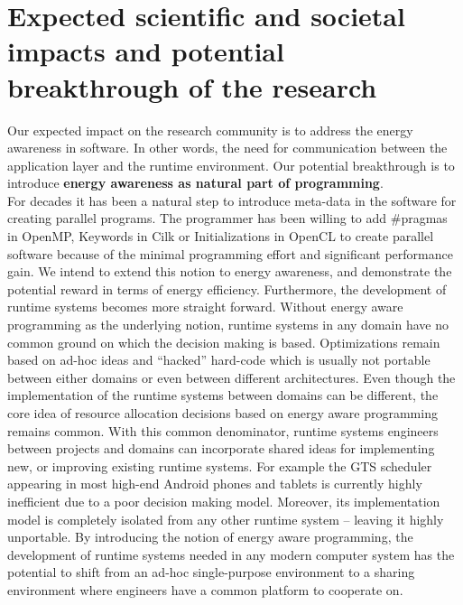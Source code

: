 \documentclass{article}
\begin{document}
\section{Expected scientific and societal impacts and potential breakthrough of the research}
Our expected impact on the research community is to address the energy awareness in software. 
In other words, the need for communication between the application layer and the runtime environment. 
Our potential breakthrough is to introduce \textbf{energy awareness as natural part of programming}.\\ 
For decades it has been a natural step to introduce meta-data in the software for creating parallel programs. 
The programmer has been willing to add \#pragmas in OpenMP, Keywords in Cilk or Initializations in OpenCL to create parallel software because of the minimal programming effort and significant performance gain. 
We intend to extend this notion to energy awareness, and demonstrate the potential reward in terms of energy efficiency. 
Furthermore, the development of runtime systems becomes more straight forward. 
Without energy aware programming as the underlying notion, runtime systems in any domain have no common ground on which the decision making is based. 
Optimizations remain based on ad-hoc ideas and ``hacked'' hard-code which is usually not portable between either domains or even between different architectures. 
Even though the implementation of the runtime systems between domains can be different, the core idea of resource allocation decisions based on energy aware programming remains common. 
With this common denominator, runtime systems engineers between projects and domains can incorporate shared ideas for implementing new, or improving existing runtime systems. 
For example the GTS scheduler appearing in most high-end Android phones and tablets is currently highly inefficient due to a poor decision making model. 
Moreover, its implementation model is completely isolated from any other runtime system – leaving it highly unportable. 
By introducing the notion of energy aware programming, the development of runtime systems needed in any modern computer system has the potential to shift from an ad-hoc single-purpose environment to a sharing environment where engineers have a common platform to cooperate on.
\end{document}
